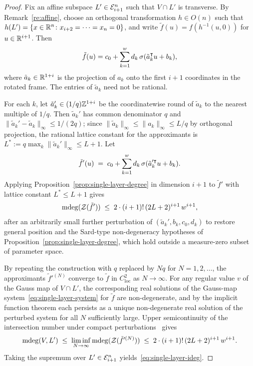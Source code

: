 \begin{proof}
  Fix an affine subspace $L'\in\mathcal{E}^n_{i+1}$ such that $V\cap L'$ is transverse. By Remark~\ref{re:affine}, choose an orthogonal transformation $h\in O(n)$ such that $h(L')=\{x\in\mathbb{R}^n\colon x_{i+2}=\cdots=x_n=0\}$, and write $\tilde f(u)=f(h^{-1}(u,0))$ for $u\in\mathbb{R}^{i+1}$. Then
  \begin{equation*}
    \tilde f(u) = c_0 + \sum_{k=1}^w d_k\,\sigma(\tilde a_k^{\intercal}u + b_k),
  \end{equation*}
  where $\tilde a_k\in\mathbb{R}^{1+i}$ is the projection of $a_k$ onto the first $i+1$ coordinates in the rotated frame. The entries of $\tilde a_k$ need not be rational.

  For each $k$, let $\tilde a_k'\in(1/q)\mathbb{Z}^{1+i}$ be the coordinatewise round of $\tilde a_k$ to the nearest multiple of $1/q$. Then $\tilde a_k'$ has common denominator $q$ and $\|\tilde a_k'-\tilde a_k\|_\infty\le 1/(2q)$; since $\|\tilde a_k\|_\infty\le\|a_k\|_\infty\le L/q$ by orthogonal projection, the rational lattice constant for the approximants is $L^*:=q\max_k\|\tilde a_k'\|_\infty\le L+1$. Let
  \begin{equation*}
    \tilde f'(u) \;=\; c_0+\sum_{k=1}^w d_k\,\sigma(\tilde a_k'^{\intercal}u+b_k).
  \end{equation*}
  Applying Proposition~\ref{prop:single-layer-degree} in dimension $i+1$ to $\tilde f'$ with lattice constant $L^*\le L+1$ gives
  \begin{equation}\label{eq:ideg-approx}
    \operatorname{\mathrm{mdeg}}(\mathcal{Z}(\tilde f')) \;\leq\; 2\cdot(i+1)!\,(2L+2)^{i+1}\,w^{i+1},
  \end{equation}
  after an arbitrarily small further perturbation of $(\tilde a_k',b_k,c_0,d_k)$ to restore general position and the Sard-type non-degeneracy hypotheses of Proposition~\ref{prop:single-layer-degree}, which hold outside a measure-zero subset of parameter space.

  By repeating the construction with $q$ replaced by $Nq$ for $N=1,2,\ldots$, the approximants $\tilde f'^{(N)}$ converge to $\tilde f$ in $C^2_{\mathrm{loc}}$ as $N\to\infty$. For any regular value $v$ of the Gauss map of $V\cap L'$, the corresponding real solutions of the Gauss-map system~\eqref{eq:single-layer-system} for $\tilde f$ are non-degenerate, and by the implicit function theorem each persists as a unique non-degenerate real solution of the perturbed system for all $N$ sufficiently large. Upper semicontinuity of the intersection number under compact perturbations~\cite[Ch.~3]{hirsch1976differential,guillemin2010differential} gives
  \begin{equation*}
    \operatorname{\mathrm{mdeg}}(V,L') \;\leq\; \liminf_{N\to\infty}\operatorname{\mathrm{mdeg}}(\mathcal{Z}(\tilde f'^{(N)})) \;\leq\; 2\cdot(i+1)!\,(2L+2)^{i+1}\,w^{i+1}.
  \end{equation*}
  Taking the supremum over $L'\in\mathcal{E}^n_{i+1}$ yields~\eqref{eq:single-layer-ideg}.
\end{proof}

